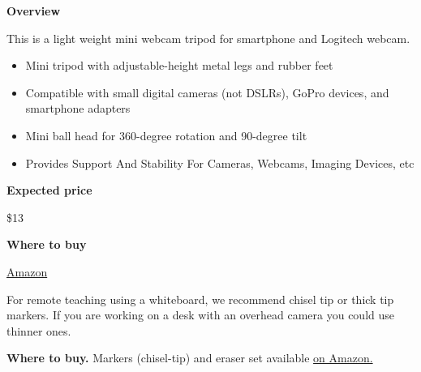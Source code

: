 \begin{gram}
\label{grm:equipment::tripod::mamawin::main}

\textbf{Overview}

This is a light weight mini webcam tripod for smartphone and Logitech webcam.

%
\begin{itemize}
\item
Mini tripod with adjustable-height metal legs and rubber feet

\item
Compatible with small digital cameras (not DSLRs), GoPro devices, and smartphone adapters 

\item
Mini ball head for 360-degree rotation and 90-degree tilt

\item
Provides Support And Stability For Cameras, Webcams, Imaging Devices, etc

\end{itemize}



\textbf{Expected price}

\$13

\textbf{Where to buy}

\href{https://www.amazon.com/Lightweight-Webcam-Tripod-Logitech-Camera/dp/B076SHC6RN/ref=sr_1_1_sspa?crid=2T6CQ3HNRR1XR&keywords=logitech+c920&qid=1582900721&s=electronics&sprefix=logitech+c,electronics,172&sr=1-1-spons&psc=1&spLa=ZW5jcnlwdGVkUXVhbGlmaWVyPUE1VjVUUFpKTU83QUkmZW5jcnlwdGVkSWQ9QTA1NTk1OTVLT1IyTzdRRFVEWkImZW5jcnlwdGVkQWRJZD1BMDEyNzk2NzEyTDVSOEdSQ1QxTEgmd2lkZ2V0TmFtZT1zcF9hdGYmYWN0aW9uPWNsaWNrUmVkaXJlY3QmZG9Ob3RMb2dDbGljaz10cnVl}{Amazon}

\end{gram}


\begin{gram}
For remote teaching using a whiteboard, we recommend chisel tip or thick tip markers. If you are working on a desk with an overhead camera you could use thinner ones.

\textbf{Where to buy.}
Markers (chisel-tip) and eraser set available
\href{https://www.amazon.com/80556-Low-Odor-Chisel-Assorted-7-Piece/dp/B00006JNJP/ref=sr_1_29?crid=3BOQYY0J0U2OZ&dchild=1&keywords=whiteboard+markers&qid=1598114240&refinements=p_n_location_browse-bin%3A6473192011&rnid=2726075011&s=office-products&sprefix=whiteboard%2Caps%2C162&sr=1-29}
{on Amazon.}

\end{gram}
